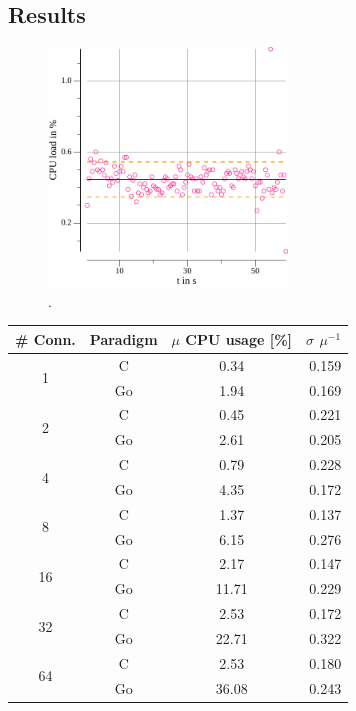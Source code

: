 \subsection{Results}
\begin{figure}[!t]
	\includegraphics[width=2.5in]{img/1cpu2c1Mb_cm.pdf}
	\caption{.}
	\label{fig_c_experiment}
\end{figure}

\begin{table}[]
\begin{tabular}{|c|ccr|}
		\hline
	\# Conn.         &  Paradigm    & $\mu$ CPU usage [\%] & $\sigma$ $\mu^{-1}$ \\
	\hline
	\multirow{2}{*}{1} & C & 0.34 & 0.159   \\
	&\cellcolor[gray]{0.9} Go &\cellcolor[gray]{0.9} 1.94 &\cellcolor[gray]{0.9} 0.169  \\ \hline
	\multirow{2}{*}{2} & C & 0.45 & 0.221   \\
	&\cellcolor[gray]{0.9} Go &\cellcolor[gray]{0.9} 2.61 &\cellcolor[gray]{0.9} 0.205  \\ \hline
	\multirow{2}{*}{4} & C & 0.79 & 0.228   \\
&\cellcolor[gray]{0.9} Go &\cellcolor[gray]{0.9} 4.35 &\cellcolor[gray]{0.9} 0.172  \\ \hline
	\multirow{2}{*}{8} & C & 1.37 & 0.137   \\
&\cellcolor[gray]{0.9} Go &\cellcolor[gray]{0.9} 6.15 &\cellcolor[gray]{0.9} 0.276  \\ \hline
	\multirow{2}{*}{16} & C & 2.17 & 0.147   \\
&\cellcolor[gray]{0.9} Go &\cellcolor[gray]{0.9} 11.71 &\cellcolor[gray]{0.9} 0.229  \\ \hline
	\multirow{2}{*}{32} & C & 2.53 & 0.172   \\
&\cellcolor[gray]{0.9} Go &\cellcolor[gray]{0.9} 22.71 &\cellcolor[gray]{0.9} 0.322  \\ \hline
	\multirow{2}{*}{64} & C & 2.53 & 0.180   \\
&\cellcolor[gray]{0.9} Go &\cellcolor[gray]{0.9} 36.08 &\cellcolor[gray]{0.9} 0.243  \\ \hline
\end{tabular}

\end{table}

